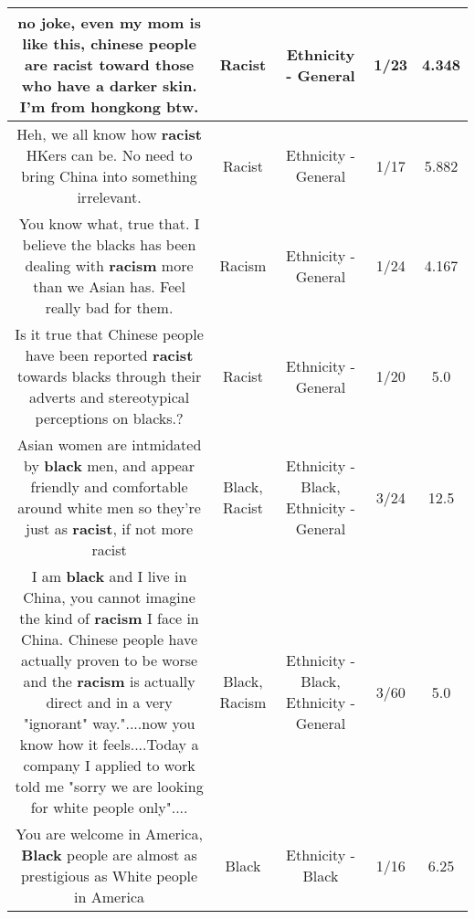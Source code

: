 \documentclass[11pt]{article}
\newlength\mylength
\begin{document}
\begin{center}
\begin{longtable}{|C{.65\mylength}|C{.30\mylength}|C{.12\mylength}|C{.12\mylength}|C{.12\mylength}|}
  \small no joke, even my mom is like this, chinese people are \textbf{racist} toward those who have a darker skin. I'm from hongkong btw.\normalsize   & Racist & Ethnicity - General & 1/23 & 4.348 \\  \hline
  \small Heh, we all know how \textbf{racist} HKers can be. No need to bring China into something irrelevant.\normalsize   & Racist & Ethnicity - General & 1/17 & 5.882 \\  \hline
  \small You know what, true that. I believe the blacks has been dealing with \textbf{racism} more than we Asian has. Feel really bad for them.\normalsize   & Racism & Ethnicity - General & 1/24 & 4.167 \\  \hline
  \small Is it true that Chinese people have been reported \textbf{racist} towards blacks through their adverts and stereotypical perceptions on blacks.?\normalsize   & Racist & Ethnicity - General & 1/20 & 5.0 \\  \hline
  \small Asian women are intmidated by \textbf{black} men, and appear friendly and comfortable around white men so they're just as \textbf{racist}, if not more racist\normalsize   & Black, Racist & Ethnicity - Black, Ethnicity - General & 3/24 & 12.5 \\  \hline
  \small I am \textbf{black} and I live in China, you cannot imagine the kind of \textbf{racism} I face in China. Chinese people have actually proven to be worse and the \textbf{racism} is actually direct and in a very "ignorant" way."....now you know how it feels....Today a company I applied to work told me "sorry we are looking for white people only"....\normalsize   & Black, Racism & Ethnicity - Black, Ethnicity - General & 3/60 & 5.0 \\  \hline
  \small You are welcome in America, \textbf{Black} people are almost as prestigious as White people in America\normalsize   & Black & Ethnicity - Black & 1/16 & 6.25 \\  \hline

\end{longtable}
\end{center}
\end{document}
